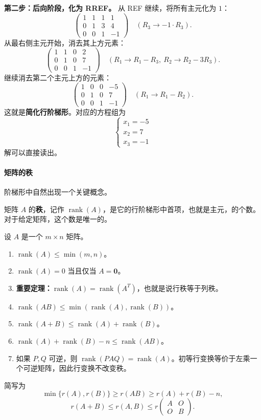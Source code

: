 \textbf{第二步：后向阶段，化为 RREF。}
从 REF 继续，将所有主元化为 $1$：
\[
\left(\begin{array}{ccc|c}
1 & 1 & 1 & 1 \\
0 & 1 & 3 & 4 \\
0 & 0 & 1 & -1
\end{array}\right) \quad (R_3\to -1\cdot R_3).
\]
从最右侧主元开始，消去其上方元素：
\[
\left(\begin{array}{ccc|c}
1 & 1 & 0 & 2 \\
0 & 1 & 0 & 7 \\
0 & 0 & 1 & -1
\end{array}\right) \quad (R_1\to R_1-R_3,\ R_2\to R_2-3R_3).
\]
继续消去第二个主元上方的元素：
\[
\left(\begin{array}{ccc|c}
1 & 0 & 0 & -5 \\
0 & 1 & 0 & 7 \\
0 & 0 & 1 & -1
\end{array}\right) \quad (R_1\to R_1-R_2).
\]
这就是\textbf{简化行阶梯形}。对应的方程组为
\[
\begin{cases}
x_1=-5\\
x_2=7\\
x_3=-1
\end{cases}
\]
解可以直接读出。

\paragraph{矩阵的秩}
阶梯形中自然出现一个关键概念。

\begin{definition}
矩阵 $A$ 的\textbf{秩}，记作 $\operatorname{rank}(A)$，是它的行阶梯形中首项，也就是主元，的个数。对于给定矩阵，这个数是唯一的。
\end{definition}

\begin{property}[秩的性质]
设 $A$ 是一个 $m\times n$ 矩阵。
\begin{enumerate}
    \item $\operatorname{rank}(A)\leq \min(m,n)$。
    \item $\operatorname{rank}(A)=0$ 当且仅当 $A=\mathbf{0}$。
    \item \textbf{重要定理：}$\operatorname{rank}(A)=\operatorname{rank}(A^T)$，也就是说行秩等于列秩。
    \item $\operatorname{rank}(AB)\leq \min(\operatorname{rank}(A),\operatorname{rank}(B))$。
    \item $\operatorname{rank}(A+B)\leq \operatorname{rank}(A)+\operatorname{rank}(B)$。
    \item $\operatorname{rank}(A)+\operatorname{rank}(B)-n\leq \operatorname{rank}(AB)$。
    \item 如果 $P,Q$ 可逆，则 $\operatorname{rank}(PAQ)=\operatorname{rank}(A)$。初等行变换等价于左乘一个可逆矩阵，因此行变换不改变秩。
\end{enumerate}
简写为
\[
\min\{r(A),r(B)\}\geq r(AB)\geq r(A)+r(B)-n,
\]
\[
r(A+B)\leq r(A,B)\leq r\begin{pmatrix} A&O\\O&B\end{pmatrix}.
\]
\end{property}

